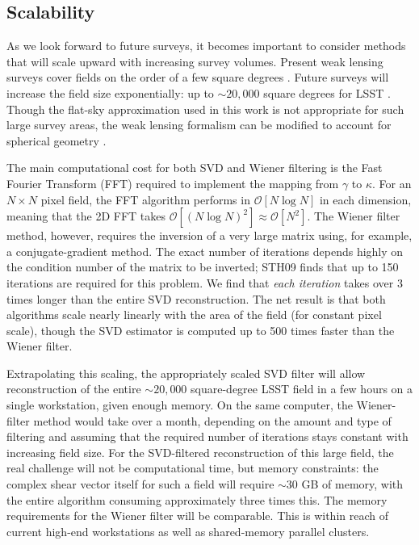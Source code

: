 \subsection{Scalability}
\label{Scalability} 

As we look forward to future surveys, it becomes important to consider methods 
that will scale upward with increasing survey volumes. Present weak lensing
surveys cover fields on the order of a few square degrees 
\citep[e.g.\ COSMOS,][]{Massey07}.  Future surveys will increase the field
size exponentially: up to $\sim\!\!20,000$ square degrees for LSST
\citep{LSST09}.  Though the flat-sky approximation used in this 
work is not appropriate for such large survey
areas, the weak lensing formalism can be modified to 
account for spherical geometry \citep[see, e.g.][]{Heavens03}. 

The main computational cost for both SVD and Wiener filtering is the
Fast Fourier Transform (FFT) required to implement the mapping from
$\gamma$ to $\kappa$.  For an $N \times N$ pixel field, the FFT algorithm 
performs in $\mathcal{O}[N\log N]$ in each dimension, 
meaning that the 2D FFT takes 
$\mathcal{O}[(N\log N)^2] \approx \mathcal{O}[N^2]$.  The Wiener
filter method, however, requires the inversion of a very large matrix 
using, for example, a conjugate-gradient method.  
The exact number of iterations
depends highly on the condition number of the matrix to be inverted;
STH09 finds that up to 150 iterations are required for this problem.
We find that \textit{each iteration} takes over 3 times longer than the 
entire SVD reconstruction. The net result is that both algorithms
scale nearly linearly with the area of the field (for constant pixel scale),
though the SVD estimator is computed up to 500 times faster 
than the Wiener filter. 

Extrapolating this scaling, the appropriately scaled 
SVD filter will allow reconstruction
of the entire $\sim\!\!20,000$ square-degree 
LSST field in a few hours on a single workstation, given
enough memory.  On the same computer, the Wiener-filter method would take 
over a month, depending on the amount and type of filtering and 
assuming that the required number of iterations stays constant with 
increasing field size. For the SVD-filtered reconstruction of this 
large field, the real challenge will not be computational time, 
but memory constraints: the complex shear
vector itself for such a field will require $\sim\!\!30$ GB of memory,
with the entire algorithm consuming approximately three times this.
The memory requirements for the Wiener filter will be comparable.
This is within reach of current high-end workstations as well as 
shared-memory parallel clusters.

